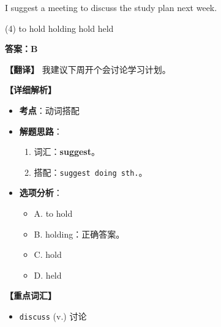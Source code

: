 \documentclass[11pt, a4paper]{article}
\newcommand{\analysis}[4]{
    \begin{solutionbox}
        \textbf{答案：#1}
        
        \textbf{【翻译】} #2
        
        \textbf{【详细解析】}
        #3
        
        \textbf{【重点词汇】}
        #4
    \end{solutionbox}
}
\newcommand{\blank}{\underline{\hspace{1.5cm}}}
\begin{document}
\begin{questions}
    \item I suggest \blank a meeting to discuss the study plan next week.
    \begin{tasks}(4)
        \task to hold \task holding \task hold \task held
    \end{tasks}
    \analysis{B}{我建议下周开个会讨论学习计划。}{
        \begin{itemize}
            \item \textbf{考点}：动词搭配
            \item \textbf{解题思路}：
                \begin{enumerate}
                    \item 词汇：\textbf{suggest}。
                    \item 搭配：\texttt{suggest doing sth.}。
                \end{enumerate}
            \item \textbf{选项分析}：
                \begin{itemize}
                    \item A. to hold
                    \item B. holding：正确答案。
                    \item C. hold
                    \item D. held
                \end{itemize}
        \end{itemize}
    }{
        \begin{itemize}
            \item \texttt{discuss} (v.) 讨论
        \end{itemize}
    }


\end{questions}
\end{document}
